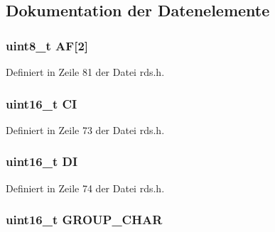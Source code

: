 \subsection{Dokumentation der Datenelemente}
\hypertarget{structgroup__0b_ae5a8515ae995b21e542b2ad52b20c34e}{}
\subsubsection[{A\+F}]{\setlength{\rightskip}{0pt plus 5cm}uint8\+\_\+t A\+F\mbox{[}2\mbox{]}}\label{structgroup__0b_ae5a8515ae995b21e542b2ad52b20c34e}


Definiert in Zeile 81 der Datei rds.\+h.

\hypertarget{structgroup__0b_aa6fd8556e02ce89fed23057f1cb37e44}{}
\subsubsection[{C\+I}]{\setlength{\rightskip}{0pt plus 5cm}uint16\+\_\+t C\+I}\label{structgroup__0b_aa6fd8556e02ce89fed23057f1cb37e44}


Definiert in Zeile 73 der Datei rds.\+h.

\hypertarget{structgroup__0b_ad020d0abff338c9c34924a44478ac591}{}
\subsubsection[{D\+I}]{\setlength{\rightskip}{0pt plus 5cm}uint16\+\_\+t D\+I}\label{structgroup__0b_ad020d0abff338c9c34924a44478ac591}


Definiert in Zeile 74 der Datei rds.\+h.

\hypertarget{structgroup__0b_a66d4119990dc4c3e040a43885e9bb953}{}
\subsubsection[{G\+R\+O\+U\+P\+\_\+\+C\+H\+A\+R}]{\setlength{\rightskip}{0pt plus 5cm}uint16\+\_\+t G\+R\+O\+U\+P\+\_\+\+C\+H\+A\+R}\label{structgroup__0b_a66d4119990dc4c3e040a43885e9bb953}


